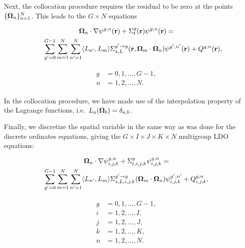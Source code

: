 \noindent Next, the collocation procedure requires the residual to be zero at the 
points $\{\mathbf\Omega_n\}_{n=1}^{N}$. This leads to the $G\times N$ equations

\noindent\begin{minipage}{0.69\textwidth}
\begin{multline*}
\mathbf\Omega_n\cdot\nabla\psi^{g,n}(\textbf{r}) + \Sigma_t^g(\textbf{r})\psi^{g,n}(\textbf{r}) =\\
\qquad \sum_{g'=0}^{G-1}\sum_{m=1}^{N}\sum_{n'=1}^{N}\langle L_{n'},L_{m}\rangle
\Sigma_{s,L}^{g'\rightarrow g}(\textbf{r},\mathbf\Omega_m\cdot\mathbf\Omega_n)\psi^{g',n'}(\textbf{r})
+ Q^{g,n}(\textbf{r}),
\end{multline*}
\end{minipage}
\hspace{-0.5cm}
\begin{minipage}{0.31\textwidth}
\begin{align}
\begin{split}
g &= 0,1,\ldots,G-1,\\
n &= 1,2,\ldots,N.
\end{split}
\end{align}
\end{minipage}
\vspace{0.1cm}

\noindent In the collocation procedure, we have made use of the interpolation property
of the Lagrange functions, i.e.\ $L_a(\mathbf\Omega_b) = \delta_{a,b}$.

Finally, we discretize the spatial variable in the same way as was done for
the discrete ordinates equations, giving the 
$G\times I \times J \times K \times N$ multigroup LDO equations:

\noindent\begin{minipage}{0.69\textwidth}
\begin{multline*}
\mathbf\Omega_n\cdot\nabla\psi_{i,j,k}^{g,n} + 
\Sigma_{t,i,j,k}^{g}\psi_{i,j,k}^{g,n} = \\
\sum_{g'=0}^{G-1}\sum_{m=1}^{N}\sum_{n'=1}^{N}\langle L_{n'},L_{m}\rangle
\Sigma_{s,L,i,j,k}^{g'\rightarrow g}(\mathbf\Omega_{m}\cdot\mathbf\Omega_n)\psi_{i,j,k}^{g',n'}
+ Q_{i,j,k}^{g,n},
\end{multline*}
\end{minipage}
\hspace{-0.5cm}
\begin{minipage}{0.31\textwidth}
\begin{align}
\begin{split}
g &= 0,1,\ldots,G-1,\\
i &= 1,2,\ldots,I,\\
j &= 1,2,\ldots,J,\\
k &= 1,2,\ldots,K,\\
n &= 1,2,\ldots,N.
\label{eq:ldo}
\end{split}
\end{align}
\end{minipage}
\vspace{0.1cm}

